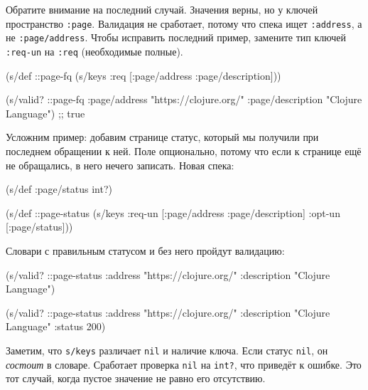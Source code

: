 Обратите внимание на последний случай. Значения верны, но у ключей пространство
\verb|:page|. Валидация не сработает, потому что спека ищет \verb|:address|,
а не \verb|:page/address|. Чтобы исправить последний пример, замените тип
ключей \verb|:req-un| на \verb|:req| (необходимые полные).


\begin{english}
  \begin{clojure}
(s/def ::page-fq
  (s/keys :req [:page/address
                :page/description]))

(s/valid? ::page-fq
          {:page/address "https://clojure.org/"
           :page/description "Clojure Language"})
;; true
  \end{clojure}
\end{english}

Усложним пример: добавим странице статус, который мы получили при
последнем обращении к ней. Поле опционально, потому что если к странице ещё не
обращались, в него нечего записать. Новая спека:

\begin{english}
  \begin{clojure}
(s/def :page/status int?)

(s/def ::page-status
  (s/keys :req-un [:page/address
                   :page/description]
          :opt-un [:page/status]))
  \end{clojure}
\end{english}

Словари с правильным статусом и без него пройдут валидацию:

\begin{english}
  \begin{clojure}
(s/valid? ::page-status
          {:address "https://clojure.org/"
           :description "Clojure Language"})

(s/valid? ::page-status
          {:address "https://clojure.org/"
           :description "Clojure Language"
           :status 200})
  \end{clojure}
\end{english}


Заметим, что \verb|s/keys| различает \verb|nil| и наличие ключа. Если статус
\verb|nil|, он \emph{состоит} в словаре. Сработает проверка \verb|nil| на
\verb|int?|, что приведёт к ошибке. Это тот случай, когда пустое значение
не равно его отсутствию.

